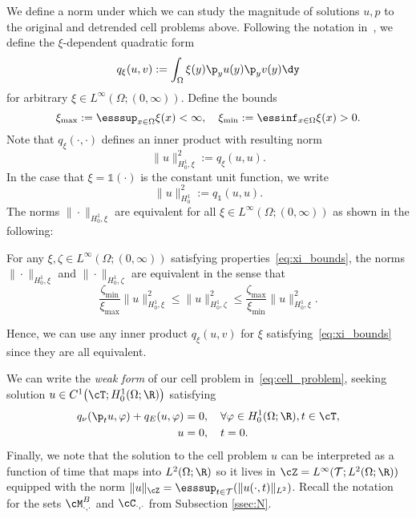 \documentclass[letterpaper,11pt]{article}
\begin{document}
We define a norm under which we can study the magnitude of solutions $u, p$ to the original and detrended cell problems above. Following the notation in~\cite{bhattacharya2023learning}, we define the $\xi$-dependent quadratic form
\begin{equation}
    q_\xi(u, v) := \int_\Omega \xi(y)\p_yu(y)\p_yv(y)\dy
\end{equation}
for arbitrary $\xi \in L^\infty(\Omega; (0, \infty))$. Define the bounds
\begin{equation}\label{eq:xi_bounds}
    \xi_{\max} := \esssup_{x \in \Omega}\xi(x) < \infty, \quad \xi_{\min} := \essinf_{x \in \Omega}\xi(x) > 0.
\end{equation}
Note that $q_\xi(\cdot, \cdot)$ defines an inner product with resulting norm
\begin{equation}\label{eq:H01_weighted}
    \|u\|_{H_0^1, \xi}^2 := q_\xi(u, u).
\end{equation}
In the case that $\xi = \mathds{1}(\cdot)$ is the constant unit function, we write
\begin{equation}
    \|u\|_{H_0^1}^2 := q_\mathds{1}(u, u).
\end{equation}
The norms $\|\cdot\|_{H_0^1, \xi}$ are equivalent for all $\xi \in L^\infty(\Omega; (0, \infty))$ as shown in the following:
\begin{lemma}\label{lem:norm_equiv}
    For any $\xi, \zeta \in L^\infty(\Omega; (0, \infty))$ satisfying properties~\eqref{eq:xi_bounds}, the norms $\|\cdot\|_{H_0^1, \xi}$ and $\|\cdot\|_{H_0^1, \zeta}$ are equivalent in the sense that
    \begin{equation}
        \frac{\zeta_{\min}}{\xi_{\max}}\|u\|_{H_0^1, \xi}^2 \leq \|u\|_{H_0^1, \zeta}^2 \leq \frac{\zeta_{\max}}{\xi_{\min}}\|u\|_{H_0^1, \xi}^2.
    \end{equation}
\end{lemma}
Hence, we can use any inner product $q_\xi(u, v)$ for $\xi$ satisfying~\eqref{eq:xi_bounds} since they are all equivalent. 

We can write the \textit{weak form} of our cell problem in~\eqref{eq:cell_problem},
seeking solution $u \in C^1\bigl(\cT; H_0^1(\Omega; \R)\bigr)$
satisfying
\begin{subequations}
\label{eq:wf}
\begin{align}
    q_\nu(\p_tu, \varphi) + q_E(u, \varphi) &= 0, \quad \forall \varphi \in H_0^1(\Omega; \R), t \in \cT,\\
    u & =0, \quad t=0.
\end{align}
\end{subequations}
 Finally, we note that the solution to the cell problem $u$ can be interpreted as a function of time that maps into $L^2(\Omega; \R)$ so it lives in $\cZ = L^\infty(\mathcal{T}; L^2(\Omega; \R))$ equipped with the norm $\|u\|_\cZ = \esssup_{t \in \mathcal{T}}(\|u(\cdot, t)\|_{L^2})$. Recall the notation for the sets $\cM^B_{\cdot, \cdot}$ and $\cC_{\cdot, \cdot}$ from Subsection \ref{ssec:N}.
\end{document}

